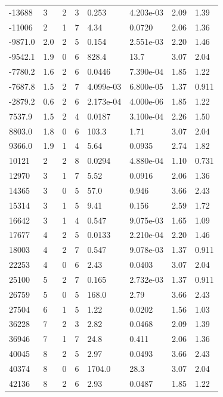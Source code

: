 \documentclass[preview]{standalone}
\begin{document}
{{\begin{tabular}{L{1.2cm}C{1.2cm} C{0.3cm}C{0.5cm} C{1.4cm}C{1.4cm} C{1.4cm}C{1.4cm}}
  -13688  &     3  & 2     &  3 &  0.253  & 4.203e-03  & 2.09 &  1.39   \\ 
  -11006  &     2  & 1     &  7 &  4.34  & 0.0720  & 2.06 &  1.36   \\ 
  -9871.0  &   2.0  & 2     &  5 &  0.154  & 2.551e-03  & 2.20 &  1.46   \\ 
  -9542.1  &   1.9  & 0     &  6 &  828.4  & 13.7  & 3.07 &  2.04   \\ 
  -7780.2  &   1.6  & 2     &  6 &  0.0446  & 7.390e-04  & 1.85 &  1.22   \\ 
  -7687.8  &   1.5  & 2     &  7 &  4.099e-03  & 6.800e-05  & 1.37 &  0.911   \\ 
  -2879.2  &   0.6  & 2     &  6 &  2.173e-04  & 4.000e-06  & 1.85 &  1.22   \\ 
  7537.9  &   1.5  & 2     &  4 &  0.0187  & 3.100e-04  & 2.26 &  1.50   \\ 
  8803.0  &   1.8  & 0     &  6 &  103.3  & 1.71  & 3.07 &  2.04   \\ 
  9366.0  &   1.9  & 1     &  4 &  5.64  & 0.0935  & 2.74 &  1.82   \\ 
  10121  &     2  & 2     &  8 &  0.0294  & 4.880e-04  & 1.10 &  0.731   \\ 
  12970  &     3  & 1     &  7 &  5.52  & 0.0916  & 2.06 &  1.36   \\ 
  14365  &     3  & 0     &  5 &  57.0  & 0.946  & 3.66 &  2.43   \\ 
  15314  &     3  & 1     &  5 &  9.41  & 0.156  & 2.59 &  1.72   \\ 
  16642  &     3  & 1     &  4 &  0.547  & 9.075e-03  & 1.65 &  1.09   \\ 
  17677  &     4  & 2     &  5 &  0.0133  & 2.210e-04  & 2.20 &  1.46   \\ 
  18003  &     4  & 2     &  7 &  0.547  & 9.078e-03  & 1.37 &  0.911   \\ 
  22253  &     4  & 0     &  6 &  2.43  & 0.0403  & 3.07 &  2.04   \\ 
  25100  &     5  & 2     &  7 &  0.165  & 2.732e-03  & 1.37 &  0.911   \\ 
  26759  &     5  & 0     &  5 &  168.0  & 2.79  & 3.66 &  2.43   \\ 
  27504  &     6  & 1     &  5 &  1.22  & 0.0202  & 1.56 &  1.03   \\ 
  36228  &     7  & 2     &  3 &  2.82  & 0.0468  & 2.09 &  1.39   \\ 
  36946  &     7  & 1     &  7 &  24.8  & 0.411  & 2.06 &  1.36   \\ 
  40045  &     8  & 2     &  5 &  2.97  & 0.0493  & 3.66 &  2.43   \\ 
  40374  &     8  & 0     &  6 &  1704.0  & 28.3  & 3.07 &  2.04   \\ 
  42136  &     8  & 2     &  6 &  2.93  & 0.0487  & 1.85 &  1.22   \\ 
\hline 
\end{tabular} 

}}
\end{document}
